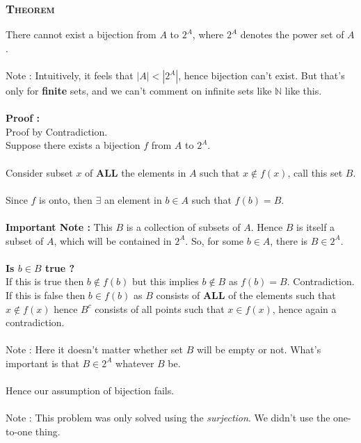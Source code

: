 \documentclass{article}
\begin{document}
\subsubsection*{\textsc{Theorem}}
There cannot exist a bijection from $A$ to $2^{A}$, where $2^{A}$ denotes the power set of $A$.\\ \\
Note : Intuitively, it feels that $|A| < |2^{A}|$, hence bijection can't exist. But that's only for \textbf{finite} sets, and we can't comment on infinite sets like $\mathbb{N}$ like this. \\ \\
\textbf{Proof :}\\
Proof by Contradiction.\\
Suppose there exists a bijection $f$ from $A$ to $2^{A}$.\\ \\
Consider subset $x$ of \textbf{ALL} the elements in $A$ such that $x \notin f(x)$, call this set $B$.\\ \\
Since $f$ is onto, then $\exists$ an element in $b \in A$ such that $f(b) = B$.
\\
\\
\textbf{Important Note :} This $B$ is a collection of subsets of $A$. Hence $B$ is itself a subset of $A$, which will be contained in $2^{A}$. So, for some $b \in A$, there is $B \in 2^{A}$.
\\
\\
\textbf{Is $b \in B$ true ?}
\\
If this is true then $b \notin f(b)$ but this implies $b \notin B$ as $f(b) = B$. Contradiction.\\
If this is false then $b \in f(b)$ as $B$ consists of \textbf{ALL} of the elements such that $x \notin f(x)$ hence $B^{c}$ consists of all points such that $x \in f(x)$, hence again a contradiction. \\ \\
Note : Here it doesn't matter whether set $B$ will be empty or not. What's important is that $B \in 2^{A}$ whatever $B$ be.\\ \\
Hence our assumption of bijection fails.\\ \\
Note : This problem was only solved using the \textit{surjection}. We didn't use the one-to-one thing.
\end{document}
